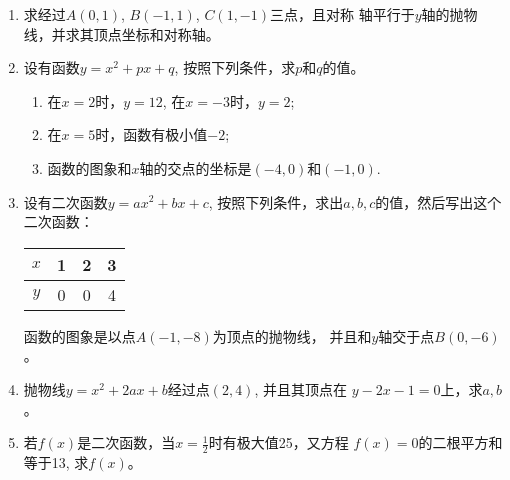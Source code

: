 \begin{ex}
\begin{enumerate}
\item 求经过$A(0,1)$, $B(-1,1)$, $C(1,-1)$三点，且对称
    轴平行于$y$轴的抛物线，并求其顶点坐标和对称轴。
    \item 设有函数$y=x^2+px+q$, 按照下列条件，求$p$和$q$的值。
    \begin{enumerate}
 \item 在$x=2$时，$y=12$, 在$x=-3$时，$y=2$;
    \item 在$x=5$时，函数有极小值$-2$;
    \item 函数的图象和$x$轴的交点的坐标是$(-4,0)$和$(-1,
    0)$.
    \end{enumerate}
   
    \item 设有二次函数$y=ax^2+bx+c$, 按照下列条件，求出$a,b,
    c$的值，然后写出这个二次函数：
    \begin{center}
        \begin{tabular}{c|ccc}
            \hline
$x$&1&2&3\\
            \hline
$y$&0&0&4\\
            \hline
        \end{tabular}
    \end{center}
    函数的图象是以点$A(-1,-8)$为顶点的抛物线，
   并且和$y$轴交于点$B(0,-6)$。

    \item 抛物线$y=x^2+2ax+b$经过点$(2,4)$, 并且其顶点在
    $y-2x-1=0$上，求$a,b$。
    \item 若$f(x)$是二次函数，当$x=\frac{1}{2}$时有极大值25，又方程
    $f(x)=0$的二根平方和等于13, 求$f(x)$。
\end{enumerate} 
\end{ex}


\begin{example}
    
\end{example}

\begin{solution}
    
\end{solution}

\begin{example}
    
\end{example}

\begin{solution}
    
\end{solution}



